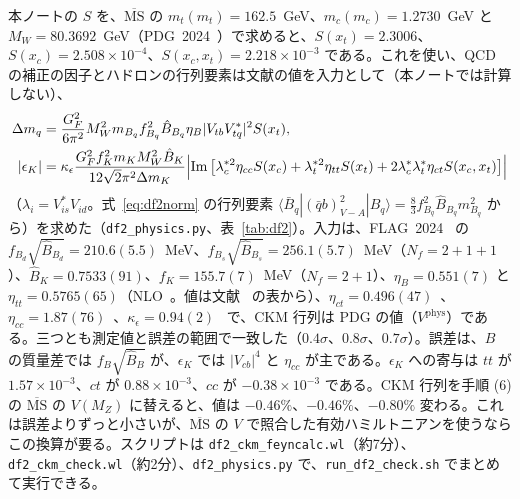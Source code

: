\documentclass[a4paper,10pt]{ltjsarticle}
\newcommand{\MSbar}{\overline{\mathrm{MS}}}
\newcommand{\im}{\mathrm{Im}\,}
\begin{document}
本ノートの $S$ を、$\MSbar$ の $m_t(m_t)=162.5$~GeV、$m_c(m_c)=1.2730$~GeV と $M_W=80.3692$~GeV（PDG~2024~\cite{pdg24}）で求めると、$S(x_t)=2.3006$、$S(x_c)=2.508\times10^{-4}$、$S(x_c,x_t)=2.218\times10^{-3}$ である。これを使い、QCD の補正の因子とハドロンの行列要素は文献の値を入力として（本ノートでは計算しない）、
\begin{equation}
\begin{split}
\Delta m_q&=\frac{G_F^2}{6\pi^2}M_W^2m_{B_q}f_{B_q}^2\hat B_{B_q}\eta_B|V_{tb}V_{tq}^*|^2S(x_t),\\
|\epsilon_K|&=\kappa_\epsilon\frac{G_F^2f_K^2m_KM_W^2\hat B_K}{12\sqrt2\pi^2\Delta m_K}\Bigl|\im\bigl[\lambda_c^{*2}\eta_{cc}S(x_c)+\lambda_t^{*2}\eta_{tt}S(x_t)+2\lambda_c^*\lambda_t^*\eta_{ct}S(x_c,x_t)\bigr]\Bigr|
\end{split}
\label{eq:dmeps}
\end{equation}
（$\lambda_i=V^*_{is}V_{id}$。式~\eqref{eq:df2norm} の行列要素 $\langle\bar B_q|(\bar qb)_{V-A}^2|B_q\rangle=\frac83f_{B_q}^2\hat B_{B_q}m_{B_q}^2$ から）を求めた（\texttt{df2\_physics.py}、表~\ref{tab:df2}）。入力は、FLAG~2024~\cite{flag24} の $f_{B_d}\sqrt{\hat B_{B_d}}=210.6(5.5)$~MeV、$f_{B_s}\sqrt{\hat B_{B_s}}=256.1(5.7)$~MeV（$N_f=2+1+1$）、$\hat B_K=0.7533(91)$、$f_K=155.7(7)$~MeV（$N_f=2+1$）、$\eta_B=0.551(7)$ と $\eta_{tt}=0.5765(65)$（NLO~\cite{bjw90}。値は文献~\cite{swme15} の表から）、$\eta_{ct}=0.496(47)$~\cite{bg10}、$\eta_{cc}=1.87(76)$~\cite{bg12}、$\kappa_\epsilon=0.94(2)$~\cite{bgi10} で、CKM 行列は PDG の値（$V^{\mathrm{phys}}$）である。三つとも測定値と誤差の範囲で一致した（$0.4\sigma$、$0.8\sigma$、$0.7\sigma$）。誤差は、$B$ の質量差では $f_B\sqrt{\hat B_B}$ が、$\epsilon_K$ では $|V_{cb}|^4$ と $\eta_{cc}$ が主である。$\epsilon_K$ への寄与は $tt$ が $1.57\times10^{-3}$、$ct$ が $0.88\times10^{-3}$、$cc$ が $-0.38\times10^{-3}$ である。CKM 行列を手順 (6) の $\MSbar$ の $V(M_Z)$ に替えると、値は $-0.46\%$、$-0.46\%$、$-0.80\%$ 変わる。これは誤差よりずっと小さいが、$\MSbar$ の $V$ で照合した有効ハミルトニアンを使うならこの換算が要る。スクリプトは \texttt{df2\_ckm\_feyncalc.wl}（約7分）、\texttt{df2\_ckm\_check.wl}（約2分）、\texttt{df2\_physics.py} で、\texttt{run\_df2\_check.sh} でまとめて実行できる。
\end{document}
